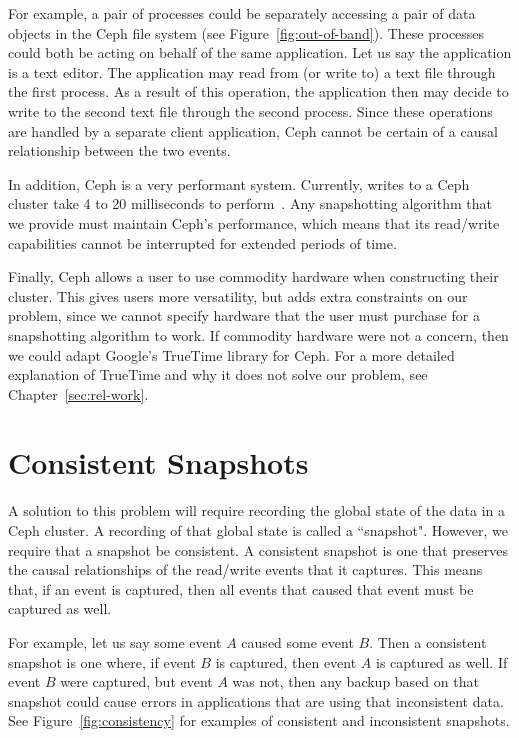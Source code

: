 For example, a pair of processes could be separately accessing a pair of
data objects in the Ceph file system (see
Figure~\ref{fig:out-of-band}). These processes could both be acting on
behalf of the same application. Let us say the application is a text
editor. The application may read from (or write to) a text file
through the first process.  As a result of this operation, the
application then may decide to write to the second text file through
the second process. Since these operations are handled by a separate
client application, Ceph cannot be certain of a causal relationship between the
two events.

In addition, Ceph is a very performant system. Currently, writes to a
Ceph cluster take 4 to 20 milliseconds to perform~\citep{Sage}. Any
snapshotting algorithm that we provide must maintain Ceph's performance, which means
that its read/write capabilities cannot be interrupted for extended
periods of time.

Finally, Ceph allows a user to use commodity hardware when
constructing their cluster. This gives users more versatility, but
adds extra constraints on our problem, since we cannot specify
hardware that the user must purchase for a snapshotting algorithm to work. If commodity 
hardware were not a concern, then we could adapt Google's TrueTime library for 
Ceph. For a more detailed explanation of TrueTime
and why it does not solve our problem, see Chapter~\ref{sec:rel-work}.

\section{Consistent Snapshots}

A solution to this problem will require recording the global state of the 
data in a Ceph cluster. A recording of that global state is called a 
``snapshot". However, we require that a snapshot be consistent. 
A consistent snapshot is one that preserves the causal relationships 
of the read/write events that it captures. This means that, if an 
event is captured, then all events that caused that 
event must be captured as well. 

For example, let us say some event $A$ caused some event $B$. 
Then a consistent snapshot 
is one where, if event $B$ is captured, then event $A$ is captured as well. If
event $B$ were captured, but event $A$ was not, then any backup based on that
snapshot could cause errors in applications that are using that inconsistent
data. See Figure~\ref{fig:consistency} for examples of consistent and 
inconsistent snapshots.

